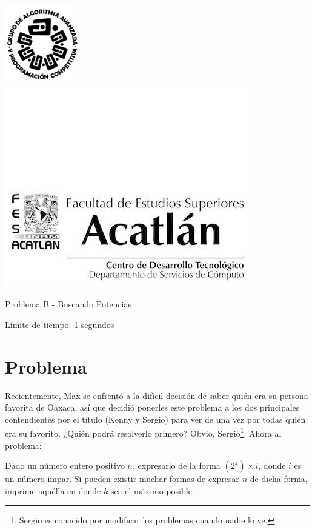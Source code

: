 \includegraphics[scale=0.6]{logo} \hspace*{9.00cm}
\includegraphics[scale=0.5]{dsc} 

\begin{center}
	\Large Problema B - Buscando Potencias
\end{center}

\begin{flushright}
Límite de tiempo: 1 segundos
\par\end{flushright}
\vspace*{-1cm}

\section*{Problema}
Recientemente, Max se enfrentó a la difícil decisión de saber quién era su persona favorita de Oaxaca, así que decidió ponerles este problema a los dos principales contendientes por el título (Kenny y Sergio) para ver de una vez por todas quién era su favorito. ¿Quién podrá resolverlo primero? Obvio, Sergio\footnote{Sergio es conocido por modificar los problemas cuando nadie lo ve.}. Ahora al problema:

Dado un número entero positivo $n$, expresarlo de la forma $(2^k)\times i$, donde $i$ es un número impar. Si pueden existir muchar formas de expresar $n$ de dicha forma, imprime aquélla en donde $k$ sea el máximo posible.

